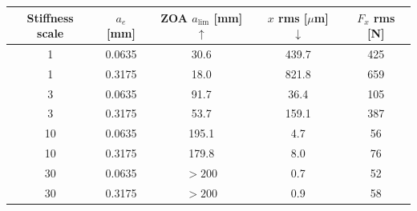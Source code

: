 \begin{tabular}{ccccc}
\toprule
Stiffness scale & $a_e$ [mm] & ZOA $a_{\lim}$ [mm] $\uparrow$ & $x$ rms [$\mu$m] $\downarrow$ & $F_x$ rms [N] \\
\midrule
1 & 0.0635 & \cellcolor{red!18}30.6 & 439.7 & 425 \\
1 & 0.3175 & \cellcolor{red!18}18.0 & 821.8 & 659 \\
\midrule
3 & 0.0635 & 91.7 & 36.4 & 105 \\
3 & 0.3175 & 53.7 & 159.1 & 387 \\
\midrule
10 & 0.0635 & 195.1 & 4.7 & 56 \\
10 & 0.3175 & 179.8 & 8.0 & 76 \\
\midrule
30 & 0.0635 & $>200$ & 0.7 & 52 \\
30 & 0.3175 & $>200$ & 0.9 & 58 \\
\bottomrule
\end{tabular}

